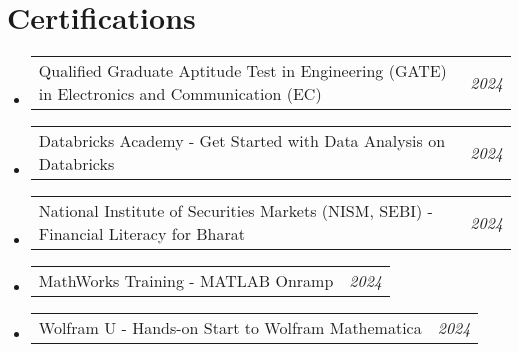 \documentclass[a4paper,11pt]{article}
\makeatletter
\newcommand{\resumePOR}[3]{
\vspace{0.5mm}\item
    \begin{tabular*}{0.97\textwidth}[t]{l@{\extracolsep{\fill}}r}
        \textbf{#1}\hspace{0.3mm}#2 & \textit{\small{#3}} 
    \end{tabular*}
    \vspace{-2mm}
}
\newcommand{\resumeSubHeadingListStart}{\begin{itemize}[leftmargin=*,labelsep=1mm]}
\newcommand{\resumeSubHeadingListEnd}{\end{itemize}\vspace{2mm}}
\makeatother
\begin{document}
\section{\textbf{Certifications}}
\vspace{-0.2mm}
\resumeSubHeadingListStart
\resumePOR{}{\footnotesize {Qualified Graduate Aptitude Test in Engineering (GATE) in Electronics and Communication (EC)}  }{\href{https://drive.google.com/file/d/1shcvrExVXRHoQDvvzEtomb_LwSz4b1zZ/view?usp=sharing}{\textcolor{darkblue}{\faCertificate}} 2024}
\resumePOR{}{\footnotesize {Databricks Academy - Get Started with Data Analysis on Databricks}  }{\href{https://drive.google.com/file/d/1HoqQiEEvQEJGrmmZKIqNTBdGUFMZYYJJ/view?usp=sharing}{\textcolor{darkblue}{\faCertificate}} 2024}
\resumePOR{}{\footnotesize {National Institute of Securities Markets (NISM, SEBI) - Financial Literacy for Bharat}  }{\href{https://drive.google.com/file/d/17fbsZgaEea0BV6-r4r2XJ_5Jf-J3Rga5/view?usp=sharing}{\textcolor{darkblue}{\faCertificate}} 2024}
\resumePOR{}{\footnotesize {MathWorks Training - MATLAB Onramp}  }{\href{https://drive.google.com/file/d/1mkDalK8A1keLxXXYWNhQnshTT9sq1vor/view?usp=sharing}{\textcolor{darkblue}{\faCertificate}} 2024}
\resumePOR{}{\footnotesize {Wolfram U - Hands-on Start to Wolfram Mathematica}  }{\href{https://drive.google.com/file/d/1UMcH0YTn9qbdHo8LIr4tHWEiZi-Xrejt/view?usp=sharing}{\textcolor{darkblue}{\faCertificate}} 2024}
\resumeSubHeadingListEnd
\vspace{-6mm}
\end{document}

